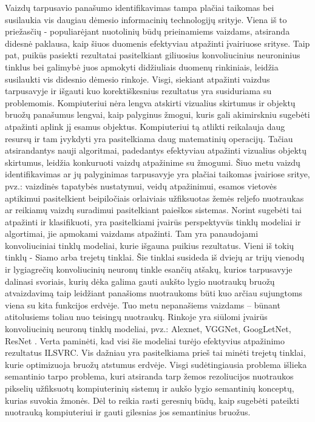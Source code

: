 \documentclass{VUMIFPSkursinis}
\DeclareRobustCommand{\[}{\begin{equation}}
\DeclareRobustCommand{\]}{\end{equation}}
\begin{document}

\thispagestyle{empty} 
Vaizdų tarpusavio panašumo identifikavimas tampa plačiai taikomas bei susilaukia vis daugiau dėmesio informacinių technologijų srityje. Viena iš to priežasčių - populiarėjant nuotolinių būdų prieinamiems vaizdams, atsiranda didesnė paklausa, kaip šiuos duomenis efektyviau atpažinti įvairiuose srityse. Taip pat, puikūs pasiekti rezultatai pasitelkiant giliuosius konvoliucinius neuroninius tinklus bei galimybė juos apmokyti didžiuliais duomenų rinkiniais, leidžia susilaukti vis didesnio dėmesio rinkoje. Visgi, siekiant atpažinti vaizdus tarpusavyje ir išgauti kuo korektiškesnius rezultatus yra susiduriama su problemomis. Kompiuteriui nėra lengva atskirti vizualius skirtumus ir objektų bruožų panašumus lengvai, kaip palyginus žmogui, kuris gali akimirskniu sugebėti atpažinti aplink jį esamus objektus. Kompiuteriui tą atlikti reikalauja daug resursų ir tam įvykdyti yra pasitelkiama daug matematinių operacijų. Tačiau atsirandantys nauji algoritmai, padedantys efektyviau atpažinti vizualius objektų skirtumus, leidžia konkuruoti vaizdų atpažinime su žmogumi. Šiuo metu vaizdų identifikavimas ar jų palyginimas tarpusavyje yra plačiai taikomas įvairiose sritye, pvz.: vaizdinės tapatybės nustatymui, veidų atpažinimui, esamos vietovės aptikimui pasitelkient beipiločiais orlaiviais užfiksuotas žemės reljefo nuotraukas ar reikiamų vaizdų suradimui pasitelkiant paieškos sistemas. Norint sugebėti tai atpažinti ir klasifikuoti, yra pasitelkiami įvairūs perspektyvūs tinklų modeliai ir algortimai, jie apmokami vaizdams atpažinti. Tam yra panaudojami konvoliuciniai tinklų modeliai, kurie išgauna puikius rezultatus. Vieni iš tokių tinklų -  Siamo arba trejetų tinklai. Šie tinklai susideda iš dviejų ar trijų vienodų ir lygiagrečių konvoliucinių neuronų tinkle esančių atšakų, kurios tarpusavyje dalinasi svoriais, kurių dėka galima gauti aukšto lygio nuotraukų bruožų atvaizdavimą taip leidžiant panašioms nuotraukoms būti kuo arčiau sujungtoms viena su kita funkcijos erdvėje. Tuo metu nepanašiems vaizdams – būnant atitolusiems toliau nuo teisingų nuotraukų. 
\newline	
Rinkoje yra siūlomi įvairūs konvoliucinių neuronų tinklų modeliai, pvz.: Alexnet, VGGNet, GoogLetNet, ResNet \cite{Aerial_image_similarity}. Verta paminėti, kad visi šie modeliai turėjo efektyvius atpažinimo rezultatus ILSVRC. Vis dažniau yra pasitelkiama prieš tai minėti trejetų tinklai, kurie optimizuoja bruožų atstumus erdvėje. Visgi sudėtingiausia problema išlieka semantinio tarpo problema, kuri atsiranda tarp žemos rezoliucijos nuotraukos pikselių užfiksuotų kompiuterinių sistemų ir aukšo lygio semantinių konceptų, kurias suvokia žmonės. Dėl to reikia rasti geresnių būdų, kaip sugebėti pateikti nuotrauką kompiuteriui ir gauti gilesnias jos semantinius bruožus. 
\end{document}
